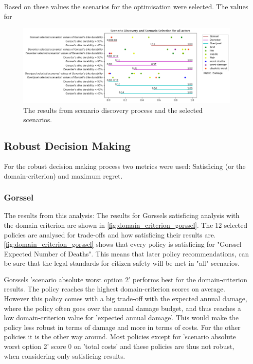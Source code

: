 Based on these values the scenarios for the optimisation were selected. The values for 


\begin{figure}[h]
    \centering
    \includegraphics[width=\textwidth]{report/figures/results/scenario_discovery.png}
    \caption{The results from scenario discovery process and the selected scenarios.}
    \label{fig:prim}
\end{figure}


\subsection{Robust Decision Making}
For the robust decision making process two metrics were used: Satisficing (or the domain-criterion) and maximum regret. 
\subsubsection{Gorssel}
The results from this analysis: The results for Gorssels satisficing analysis with the domain criterion are shown in \autoref{fig:domain_criterion_gorssel}. The 12 selected policies are analysed for trade-offs and how satisficing their results are. \newline
\autoref{fig:domain_criterion_gorssel} shows that every policy is satisficing for "Gorssel Expected Number of Deaths". This means that later policy recommendations, can be sure that the legal standards for citizen safety will be met in "all" scenarios. \newline

Gorssels 'scenario absolute worst option 2' performs best for the domain-criterion results. The policy reaches the highest domain-criterion scores on average. However this policy comes with a big trade-off with the expected annual damage, where the policy often goes over the annual damage budget, and thus reaches a low domain-criterion value for 'expected annual damage'. This would make the policy less robust in terms of damage and more in terms of costs. For the other policies it is the other way around. Most policies except for 'scenario absolute worst option 2' score 0 on 'total costs' and these policies are thus not robust, when considering only satisficing results.  

